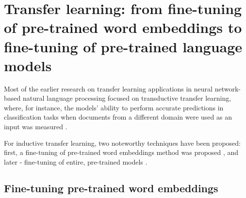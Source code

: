 




\section{Transfer learning: from fine-tuning of pre-trained word embeddings to fine-tuning of pre-trained language models}

Most of the earlier research on transfer learning applications in neural network-based natural language processing focused on transductive transfer learning, where, for instance, the models' ability to perform accurate predictions in classification tasks when documents from a different domain were used as an input was measured \cite{transductive:blitzer,ulmfit}. 

For inductive transfer learning, two noteworthy techniques have been proposed: first, a fine-tuning of pre-trained word embeddings method was proposed \cite{word2vec}, and later - fine-tuning of entire, pre-trained models \cite{ulmfit}.

\subsection{Fine-tuning pre-trained word embeddings}
\label{finetuning:embeddings}

